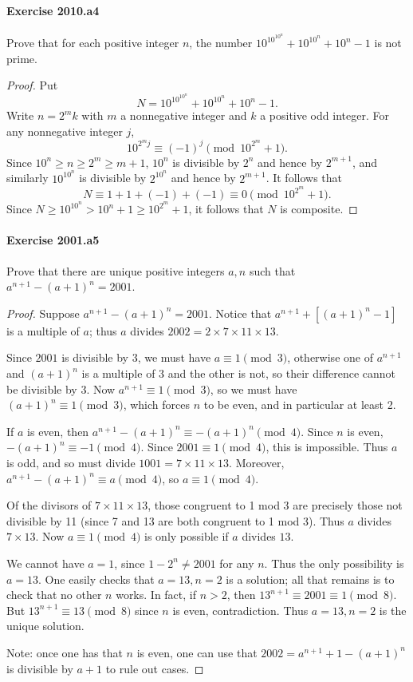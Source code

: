 \documentclass{article}
\begin{document}
\paragraph{Exercise 2010.a4} Prove that for each positive integer $n$, the number $10^{10^{10^n}}+10^{10^n}+10^n-1$ is not prime.
\begin{proof}
    Put
\[
N = 10^{10^{10^n}} + 10^{10^n} + 10^n - 1.
\]
Write $n = 2^m k$ with $m$ a nonnegative integer and $k$ a positive odd integer.
For any nonnegative integer $j$,
\[
10^{2^m j} \equiv (-1)^j \pmod{10^{2^m} + 1}.
\]
Since $10^n \geq n \geq 2^m \geq m+1$, $10^n$ is divisible by $2^n$ and hence by $2^{m+1}$,
and similarly $10^{10^n}$ is divisible by $2^{10^n}$ and hence by $2^{m+1}$. It follows that
\[
N \equiv 1 + 1 + (-1) + (-1) \equiv 0 \pmod{10^{2^m} + 1}.
\]
Since $N \geq 10^{10^n} > 10^n + 1 \geq 10^{2^m} + 1$, it follows that $N$ is composite.
\end{proof}



\paragraph{Exercise 2001.a5} Prove that there are unique positive integers $a, n$ such that $a^{n+1}-(a+1)^n=2001$.
\begin{proof}
    Suppose $a^{n+1} - (a+1)^n = 2001$.
Notice that $a^{n+1} + [(a+1)^n - 1]$ is a multiple of $a$; thus
$a$ divides $2002 = 2 \times 7 \times 11 \times 13$.

Since $2001$ is divisible by 3, we must have $a \equiv 1 \pmod{3}$,
otherwise one of $a^{n+1}$ and $(a+1)^n$ is a multiple of 3 and the
other is not, so their difference cannot be divisible by 3. Now
$a^{n+1} \equiv 1 \pmod{3}$, so we must have $(a+1)^n \equiv 1
\pmod{3}$, which forces $n$ to be even, and in particular at least 2.

If $a$ is even, then $a^{n+1} - (a+1)^n \equiv -(a+1)^n \pmod{4}$.
Since $n$ is even, $-(a+1)^n \equiv -1 \pmod{4}$. Since $2001 \equiv 1
\pmod{4}$, this is impossible. Thus $a$ is odd, and so must divide
$1001 = 7 \times 11 \times 13$. Moreover, $a^{n+1} - (a+1)^n \equiv a
\pmod{4}$, so $a \equiv 1 \pmod{4}$.

Of the divisors of $7 \times 11 \times 13$, those congruent to 1 mod 3
are precisely those not divisible by 11 (since 7 and 13 are both
congruent to 1 mod 3). Thus $a$ divides $7 \times 13$. Now
$a \equiv 1 \pmod{4}$ is only possible if $a$ divides $13$.

We cannot have $a=1$, since $1 - 2^n \neq 2001$ for any $n$. Thus
the only possibility is $a = 13$. One easily checks that $a=13, n=2$ is a
solution; all that remains is to check that no other $n$ works. In fact,
if $n > 2$, then $13^{n+1} \equiv 2001 \equiv 1 \pmod{8}$.
But $13^{n+1} \equiv 13 \pmod{8}$ since $n$ is even, contradiction.
Thus $a=13, n=2$ is the unique solution.

Note: once one has that $n$ is even, one can use that $2002
=a^{n+1} + 1 - (a+1)^n$ is divisible by $a+1$ to rule out cases.
\end{proof}
\end{document}
